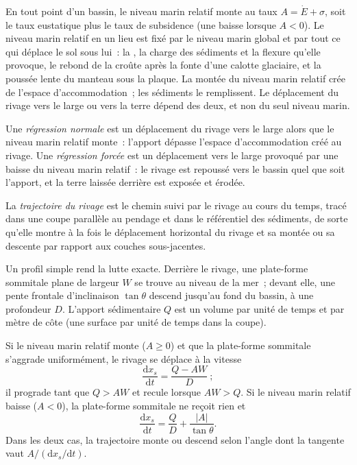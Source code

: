 En tout point d'un bassin, le niveau marin relatif monte au taux $A = \dot E
+ \sigma$, soit le taux eustatique plus le taux de subsidence (une baisse lorsque $A < 0$).
Le niveau marin relatif en un lieu est fixé par le niveau marin global et par
tout ce qui déplace le sol sous lui~: la , la charge des sédiments et
la flexure qu'elle provoque, le rebond de la croûte après la fonte d'une calotte glaciaire, et
la poussée lente du manteau sous la plaque. La montée du niveau marin relatif crée
de l'espace d'accommodation~; les sédiments le remplissent. Le déplacement du rivage vers le
large ou vers la terre dépend des deux, et non du seul niveau
marin.

\begin{definition}\label{def:b3:sequence-stratigraphy:regression}
Une \emph{régression normale} est un déplacement du rivage vers le large alors que le
niveau marin relatif monte~: l'apport dépasse
l'espace d'accommodation créé au rivage. Une \emph{régression forcée}
est un déplacement vers le large provoqué par une baisse du niveau marin relatif~: le
rivage est repoussé vers le bassin quel que soit l'apport, et la terre laissée derrière est
exposée et érodée.
\end{definition}

\begin{definition}\label{def:b3:sequence-stratigraphy:trajectory}
La \emph{trajectoire du rivage} est le chemin suivi par le
rivage au cours du temps, tracé dans une coupe parallèle au pendage et dans le référentiel des
sédiments, de sorte qu'elle montre à la fois le déplacement horizontal du rivage et sa
montée ou sa descente par rapport aux couches sous-jacentes.
\end{definition}

Un profil simple rend la lutte exacte. Derrière le rivage, une plate-forme sommitale plane
de largeur $W$ se trouve au niveau de la mer~; devant elle, une pente frontale d'inclinaison
$\tan\theta$ descend jusqu'au fond du bassin, à une profondeur $D$. L'apport sédimentaire
$Q$ est un volume par unité de temps et par mètre de côte (une surface par unité de temps
dans la coupe).

\begin{proposition}\label{prop:b3:sequence-stratigraphy:trajectory}
Si le niveau marin relatif monte ($A \ge 0$) et que la plate-forme sommitale s'aggrade uniformément,
le rivage se déplace à la vitesse
\[
\frac{\mathrm dx_s}{\mathrm dt} = \frac{Q - AW}{D}~;
\]
il prograde tant que $Q > AW$ et recule lorsque $AW > Q$. Si le niveau marin relatif
baisse ($A < 0$), la plate-forme sommitale ne reçoit rien et
\[
\frac{\mathrm dx_s}{\mathrm dt} = \frac{Q}{D} + \frac{|A|}{\tan\theta}.
\]
Dans les deux cas, la trajectoire monte ou descend selon l'angle dont la tangente vaut
$A/(\mathrm dx_s/\mathrm dt)$.
\end{proposition}

